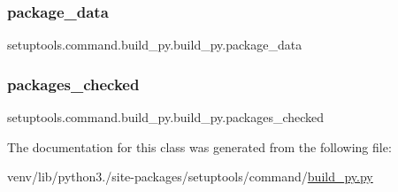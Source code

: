 \subsubsection{\texorpdfstring{package\+\_\+data}{package\_data}}
{\footnotesize\ttfamily setuptools.\+command.\+build\+\_\+py.\+build\+\_\+py.\+package\+\_\+data}

\mbox{\label{classsetuptools_1_1command_1_1build__py_1_1build__py_a748973ff26b6980cef5282fa66c3ba38}} 
\subsubsection{\texorpdfstring{packages\+\_\+checked}{packages\_checked}}
{\footnotesize\ttfamily setuptools.\+command.\+build\+\_\+py.\+build\+\_\+py.\+packages\+\_\+checked}



The documentation for this class was generated from the following file\+:\begin{DoxyCompactItemize}
\item 
venv/lib/python3./site-\/packages/setuptools/command/\hyperlink{setuptools_2command_2build__py_8py}{build\+\_\+py.\+py}\end{DoxyCompactItemize}
